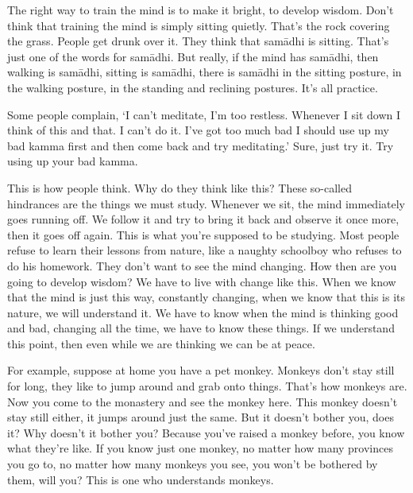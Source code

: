The right way to train the mind is to make it bright, to develop wisdom. Don't think that training the mind is simply sitting quietly. That's the rock covering the grass. People get drunk over it. They think that sam\=adhi is sitting. That's just one of the words for sam\=adhi. But really, if the mind has sam\=adhi, then walking is sam\=adhi, sitting is sam\=adhi, there is sam\=adhi in the sitting posture, in the walking posture, in the standing and reclining postures. It's all practice.

Some people complain, `I can't meditate, I'm too restless. Whenever I sit down I think of this and that. I can't do it. I've got too much bad  I should use up my bad kamma first and then come back and try meditating.' Sure, just try it. Try using up your bad kamma.

This is how people think. Why do they think like this? These so-called hindrances are the things we must study. Whenever we sit, the mind immediately goes running off. We follow it and try to bring it back and observe it once more, then it goes off again. This is what you're supposed to be studying. Most people refuse to learn their lessons from nature, like a naughty schoolboy who refuses to do his homework. They don't want to see the mind changing. How then are you going to develop wisdom? We have to live with change like this. When we know that the mind is just this way, constantly changing, when we know that this is its nature, we will understand it. We have to know when the mind is thinking good and bad, changing all the time, we have to know these things. If we understand this point, then even while we are thinking we can be at peace.

For example, suppose at home you have a pet monkey. Monkeys don't stay still for long, they like to jump around and grab onto things. That's how monkeys are. Now you come to the monastery and see the monkey here. This monkey doesn't stay still either, it jumps around just the same. But it doesn't bother you, does it? Why doesn't it bother you? Because you've raised a monkey before, you know what they're like. If you know just one monkey, no matter how many provinces you go to, no matter how many monkeys you see, you won't be bothered by them, will you? This is one who understands monkeys.

